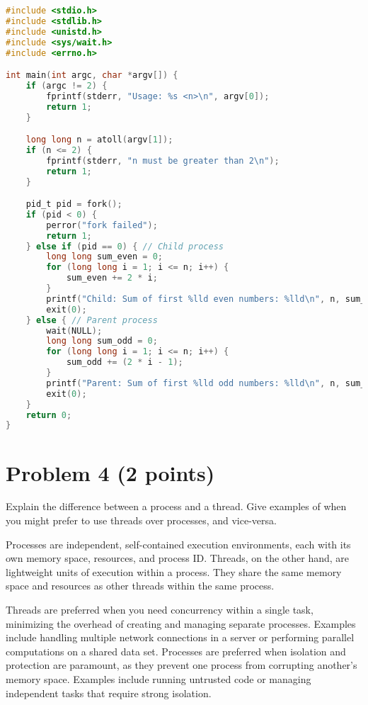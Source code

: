 \documentclass{article}
\begin{document}
\begin{lstlisting}[language=C, caption=Even and Odd Sum Calculation]
#include <stdio.h>
#include <stdlib.h>
#include <unistd.h>
#include <sys/wait.h>
#include <errno.h>

int main(int argc, char *argv[]) {
    if (argc != 2) {
        fprintf(stderr, "Usage: %s <n>\n", argv[0]);
        return 1;
    }

    long long n = atoll(argv[1]);
    if (n <= 2) {
        fprintf(stderr, "n must be greater than 2\n");
        return 1;
    }

    pid_t pid = fork();
    if (pid < 0) {
        perror("fork failed");
        return 1;
    } else if (pid == 0) { // Child process
        long long sum_even = 0;
        for (long long i = 1; i <= n; i++) {
            sum_even += 2 * i;
        }
        printf("Child: Sum of first %lld even numbers: %lld\n", n, sum_even);
        exit(0);
    } else { // Parent process
        wait(NULL);
        long long sum_odd = 0;
        for (long long i = 1; i <= n; i++) {
            sum_odd += (2 * i - 1);
        }
        printf("Parent: Sum of first %lld odd numbers: %lld\n", n, sum_odd);
        exit(0);
    }
    return 0;
}
\end{lstlisting}


\section*{Problem 4 (2 points)}

Explain the difference between a process and a thread.  Give examples of when you might prefer to use threads over processes, and vice-versa.

Processes are independent, self-contained execution environments, each with its own memory space, resources, and process ID. Threads, on the other hand, are lightweight units of execution within a process.  They share the same memory space and resources as other threads within the same process.

Threads are preferred when you need concurrency within a single task, minimizing the overhead of creating and managing separate processes.  Examples include handling multiple network connections in a server or performing parallel computations on a shared data set.  Processes are preferred when isolation and protection are paramount, as they prevent one process from corrupting another's memory space. Examples include running untrusted code or managing independent tasks that require strong isolation.
\end{document}
